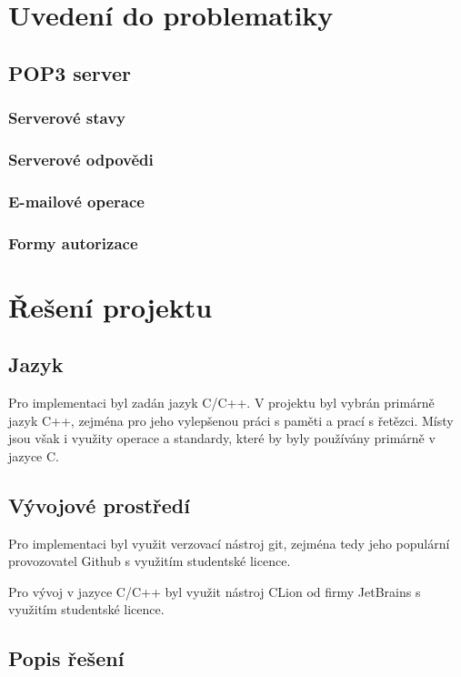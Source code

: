 \documentclass[11pt,a4paper]{report}
\begin{document}
    \clearpage
    \section{Uvedení do problematiky}
    \subsection{POP3 server}
    \label{subsec:pop3server}
    \subsubsection{Serverové stavy}
    \label{subsec:serverstatus}
    \subsubsection{Serverové odpovědi}
    \label{subsec:commresponse}
    \subsubsection{E-mailové operace}
    \label{subsec:mailoperations}
    \subsubsection{Formy autorizace}
    \label{subsec:authmethods}

    \clearpage
    \section{Řešení projektu}
    \subsection{Jazyk}
    Pro implementaci byl zadán jazyk C/C++. V projektu byl vybrán primárně jazyk C++, zejména pro jeho vylepšenou práci s paměti a prací s řetězci. Místy jsou však i využity operace a standardy, které by byly používány primárně v jazyce C.
    \subsection{Vývojové prostředí}
    Pro implementaci byl využit verzovací nástroj git, zejména tedy jeho populární provozovatel Github s využitím studentské licence.\par
    Pro vývoj v jazyce C/C++ byl využit nástroj CLion od firmy JetBrains s využitím studentské licence.
    \subsection{Popis řešení}
\end{document}
